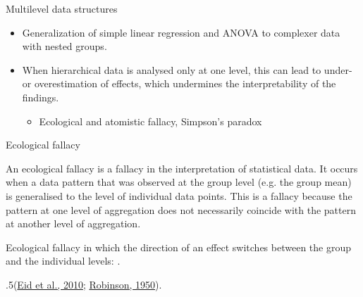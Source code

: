 \documentclass[ignorenonframetext,]{beamer}
\providecommand{\tightlist}{%
  \setlength{\itemsep}{0pt}\setlength{\parskip}{0pt}}
\begin{document}
%
\begin{frame}{\color{darkblue}Multilevel data structures}

\begin{itemize}
\tightlist 
\item Generalization of simple linear regression and ANOVA to complexer data with nested groups.
\pause
\item When hierarchical data is analysed only at one level, this can lead to under- or overestimation of effects, which undermines the interpretability of the findings. 
\pause
\begin{itemize}
\tightlist
\item[$\rightarrow$] Ecological and atomistic fallacy, Simpson's paradox 
\end{itemize}
\end{itemize}
\end{frame}

%
\begin{frame}{\color{darkblue}Ecological fallacy}

\begin{block}{}
An ecological fallacy is a fallacy in the interpretation of statistical data. It occurs when a data pattern that was observed at the group level (e.g. the group mean) is generalised to the level of individual data points. This is a fallacy because the pattern at one level of aggregation does not necessarily coincide with the pattern at another level of aggregation. 
\end{block}
\pause
Ecological fallacy in which the direction of an effect switches between the group and the individual levels: {\color{teal}{Simpson's Paradox}}.

\par\begin{spacing}{.5}\begingroup\tiny(\href{https://www.semanticscholar.org/paper/Statistik-und-Forschungsmethoden-Eid-Gollwitzer/6ea32c37f2621c9267f1c28ba2eaf7c7b29d4710}{Eid et al., 2010}; \href{https://doi.org/10.2307/2087176}{Robinson, 1950}).\endgroup\end{spacing}


\end{frame}
\end{document}
